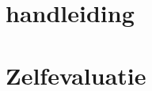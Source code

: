 \documentclass[a4paper,11pt]{article}
\begin{document}
%


\section{handleiding}

\section{Zelfevaluatie}



\end{document}
